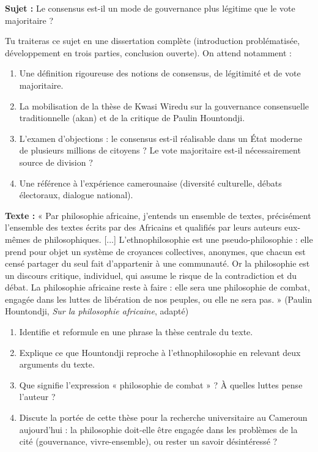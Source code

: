 \documentclass[11pt]{article}
\newcommand{\cle}[1]{{\popxbold\color{popdark}#1}}
\begin{document}
\begin{exercice}[Dissertation]
\textbf{Sujet :} Le consensus est-il un mode de gouvernance plus légitime que le vote majoritaire ?

\medskip
Tu traiteras ce sujet en une dissertation complète (introduction problématisée, développement en trois parties, conclusion ouverte). On attend notamment :
\begin{enumerate}
\item Une définition rigoureuse des notions de \cle{consensus}, de \cle{légitimité} et de \cle{vote majoritaire}.
\item La mobilisation de la thèse de Kwasi Wiredu sur la gouvernance consensuelle traditionnelle (akan) et de la critique de Paulin Hountondji.
\item L'examen d'objections : le consensus est-il réalisable dans un État moderne de plusieurs millions de citoyens ? Le vote majoritaire est-il nécessairement source de division ?
\item Une référence à l'expérience camerounaise (diversité culturelle, débats électoraux, dialogue national).
\end{enumerate}
\end{exercice}

\begin{exercice}
\textbf{Texte :} « Par philosophie africaine, j'entends un ensemble de textes, précisément l'ensemble des textes écrits par des Africains et qualifiés par leurs auteurs eux-mêmes de philosophiques. [...] L'ethnophilosophie est une pseudo-philosophie : elle prend pour objet un système de croyances collectives, anonymes, que chacun est censé partager du seul fait d'appartenir à une communauté. Or la philosophie est un discours critique, individuel, qui assume le risque de la contradiction et du débat. La philosophie africaine reste à faire : elle sera une philosophie de combat, engagée dans les luttes de libération de nos peuples, ou elle ne sera pas. » (Paulin Hountondji, \emph{Sur la philosophie africaine}, adapté)

\begin{enumerate}
\item Identifie et reformule en une phrase la thèse centrale du texte.
\item Explique ce que Hountondji reproche à l'ethnophilosophie en relevant deux arguments du texte.
\item Que signifie l'expression « philosophie de combat » ? À quelles luttes pense l'auteur ?
\item Discute la portée de cette thèse pour la recherche universitaire au Cameroun aujourd'hui : la philosophie doit-elle être engagée dans les problèmes de la cité (gouvernance, vivre-ensemble), ou rester un savoir désintéressé ?
\end{enumerate}
\end{exercice}
\end{document}
